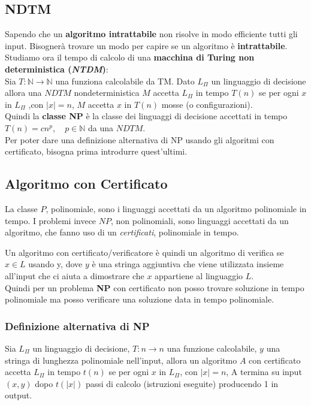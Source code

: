 \subsection{NDTM}
Sapendo che un \textbf{algoritmo intrattabile} non risolve in modo efficiente tutti gli input. Bisognerà trovare un modo per capire se un algoritmo è \textbf{intrattabile}.\\
Studiamo ora il tempo di calcolo di una \textbf{macchina di Turing non deterministica (\textit{NTDM})}: \\ 
Sia $T:\mathbb{N}\to\mathbb{N}$ una funziona calcolabile da TM. Dato $L_\Pi$ un linguaggio di decisione allora una $NDTM$ nondeterministica  $M$ accetta $L_\Pi$ in tempo $T(n)$ se per ogni $x$ in $L_\Pi$ ,con $|x|=n$,  $M$ accetta $x$ in $T(n)$ mosse (o configurazioni).\\ 
    
Quindi la \textbf{classe NP} è la classe dei linguaggi di decisione accettati in tempo $T(n)=cn^p,\quad p\in \mathbb{N}$ da una $NDTM$. \\
Per poter dare una definizione alternativa di NP usando gli algoritmi con certificato, bisogna prima introdurre quest'ultimi.

\subsection{Algoritmo con Certificato}
La classe $P$, polinomiale, sono i linguaggi accettati da un algoritmo polinomiale in tempo. I problemi invece $NP$, non polinomiali, sono linguaggi accettati da un algoritmo, che fanno uso di un \textit{ certificati}, polinomiale in tempo. 

Un algoritmo con certificato/verificatore è quindi un algoritmo di verifica se $x \in L$ usando y, dove $y$ è una stringa aggiuntiva che viene utilizzata insieme all'input che ci aiuta a dimostrare che $x$ appartiene al linguaggio $L$.\\
Quindi per un problema \textbf{NP} con certificato non posso trovare soluzione in tempo polinomiale ma posso verificare una soluzione data in tempo polinomiale.\\ 

\subsubsection{Definizione alternativa di NP}
Sia $L_\Pi$ un linguaggio di decisione, $T:n\to n$ una funzione calcolabile, $y$ una stringa di lunghezza polinomiale nell'input, allora un algoritmo $A$ con certificato accetta $L_\Pi$ in tempo $t(n)$ se per ogni $x$ in $L_\Pi$, con $|x|=n$, A termina su input $(x,y)$ dopo $t(|x|)$ passi di calcolo (istruzioni eseguite) producendo 1 in output.
  
